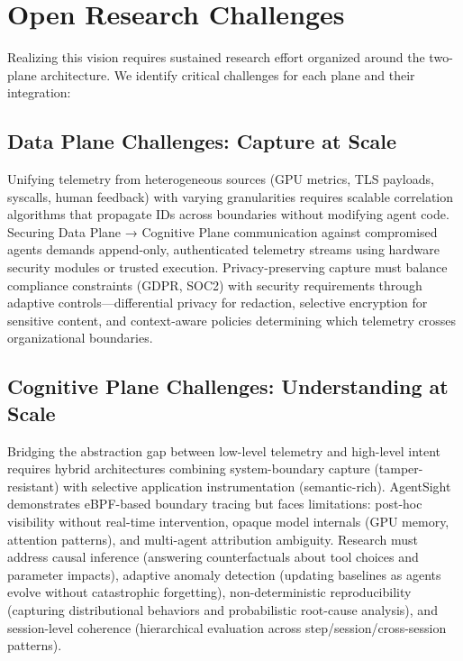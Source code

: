 \documentclass[sigplan,screen,9pt]{acmart}
\begin{document}
\section{Open Research Challenges}

Realizing this vision requires sustained research effort organized around the two-plane architecture. We identify critical challenges for each plane and their integration:

\subsection{Data Plane Challenges: Capture at Scale}

Unifying telemetry from heterogeneous sources (GPU metrics, TLS payloads, syscalls, human feedback) with varying granularities requires scalable correlation algorithms that propagate IDs across boundaries without modifying agent code. Securing Data Plane → Cognitive Plane communication against compromised agents demands append-only, authenticated telemetry streams using hardware security modules or trusted execution. Privacy-preserving capture must balance compliance constraints (GDPR, SOC2) with security requirements through adaptive controls—differential privacy for redaction, selective encryption for sensitive content, and context-aware policies determining which telemetry crosses organizational boundaries.

\subsection{Cognitive Plane Challenges: Understanding at Scale}

Bridging the abstraction gap between low-level telemetry and high-level intent requires hybrid architectures combining system-boundary capture (tamper-resistant) with selective application instrumentation (semantic-rich). AgentSight~\cite{zheng2025agentsight} demonstrates eBPF-based boundary tracing but faces limitations: post-hoc visibility without real-time intervention, opaque model internals (GPU memory, attention patterns), and multi-agent attribution ambiguity. Research must address causal inference (answering counterfactuals about tool choices and parameter impacts), adaptive anomaly detection (updating baselines as agents evolve without catastrophic forgetting), non-deterministic reproducibility (capturing distributional behaviors and probabilistic root-cause analysis), and session-level coherence (hierarchical evaluation across step/session/cross-session patterns).
\end{document}
